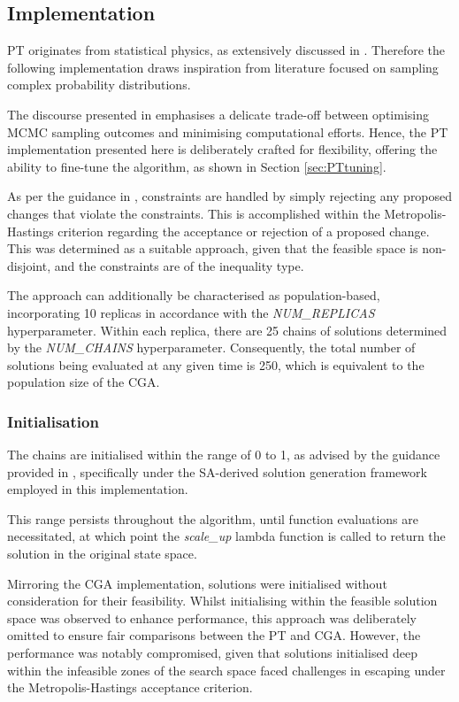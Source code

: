 \documentclass[10pt]{article}
\begin{document}
\begin{multicols}{2}
\subsection{Implementation}

PT originates from statistical physics, as extensively discussed in \cite{Earl_2005}. Therefore the following implementation draws inspiration from literature focused on sampling complex probability distributions. 

The discourse presented in \cite{Earl_2005} emphasises a delicate trade-off between optimising MCMC sampling outcomes and minimising computational efforts. Hence, the PT implementation presented here is deliberately crafted for flexibility, offering the ability to fine-tune the algorithm, as shown in Section \ref{sec:PTtuning}.

As per the guidance in \cite{parks2023geneticalgorithmsSA}, constraints are handled by simply rejecting any proposed changes that violate the constraints. This is accomplished within the Metropolis-Hastings criterion regarding the acceptance or rejection of a proposed change. This was determined as a suitable approach, given that the feasible space is non-disjoint, and the constraints are of the inequality type.

The approach can additionally be characterised as population-based, incorporating 10 replicas in accordance with the \textit{NUM\_REPLICAS} hyperparameter. Within each replica, there are 25 chains of solutions determined by the \textit{NUM\_CHAINS} hyperparameter. Consequently, the total number of solutions being evaluated at any given time is 250, which is equivalent to the population size of the CGA.

\subsubsection{Initialisation}
The chains are initialised within the range of 0 to 1, as advised by the guidance provided in \cite{NT90-A34350}, specifically under the SA-derived solution generation framework employed in this implementation.

This range persists throughout the algorithm, until function evaluations are necessitated, at which point the \textit{scale\_up} lambda function is called to return the solution in the original state space.

Mirroring the CGA implementation, solutions were initialised without consideration for their feasibility. Whilst initialising within the feasible solution space was observed to enhance performance, this approach was deliberately omitted to ensure fair comparisons between the PT and CGA. However, the performance was notably compromised, given that solutions initialised deep within the infeasible zones of the search space faced challenges in escaping under the Metropolis-Hastings acceptance criterion.


\end{multicols}
\end{document}
